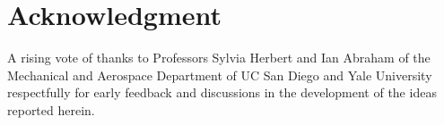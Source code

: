 \section{Acknowledgment}
A rising vote of thanks to Professors Sylvia Herbert and Ian Abraham of the Mechanical and Aerospace Department of UC San Diego and Yale University respectfully for early feedback and discussions in the development of the ideas reported herein.